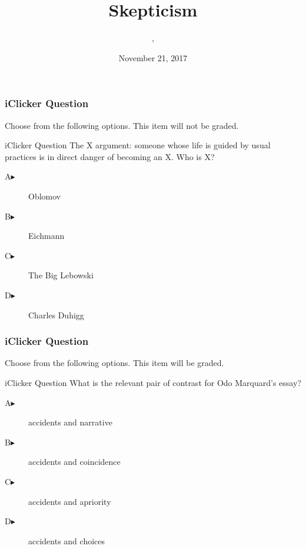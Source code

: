 \documentclass[xcolor=dvipsnames]{beamer}
\title{Skepticism}
\subtitle{{\CourseNumber}, {\CourseInst}}
\author{\CourseName}
\date{November 21, 2017}
\begin{document}
\begin{frame}
  \titlepage
\end{frame}

\begin{frame}
  \frametitle{iClicker Question}
Choose from the following options. This item will not be graded.
\begin{block}{iClicker Question}
The X argument: someone whose life is guided by usual practices is in
direct danger of becoming an X. Who is X?
\end{block}
\begin{description}
\item[A\hspace{.2in}$\blacktriangleright$] Oblomov
\item[B\hspace{.2in}$\blacktriangleright$] Eichmann
\item[C\hspace{.2in}$\blacktriangleright$] The Big Lebowski
\item[D\hspace{.2in}$\blacktriangleright$] Charles Duhigg
\end{description}
\end{frame}

\begin{frame}
  \frametitle{iClicker Question}
Choose from the following options. This item will be graded.
\begin{block}{iClicker Question}
What is the relevant pair of contrast for Odo Marquard's essay?
\end{block}
\begin{description}
\item[A\hspace{.2in}$\blacktriangleright$] accidents and narrative
\item[B\hspace{.2in}$\blacktriangleright$] accidents and coincidence
\item[C\hspace{.2in}$\blacktriangleright$] accidents and apriority
\item[D\hspace{.2in}$\blacktriangleright$] accidents and choices
\end{description}
\end{frame}
\end{document}
